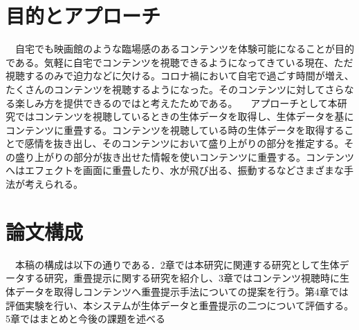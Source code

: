 \section{目的とアプローチ}
　自宅でも映画館のような臨場感のあるコンテンツを体験可能になることが目的である。気軽に自宅でコンテンツを視聴できるようになってきている現在、ただ視聴するのみで迫力などに欠ける。コロナ禍において自宅で過ごす時間が増え、たくさんのコンテンツを視聴するようになった。そのコンテンツに対してさらなる楽しみ方を提供できるのではと考えたためである。
　アプローチとして本研究ではコンテンツを視聴しているときの生体データを取得し、生体データを基にコンテンツに重畳する。コンテンツを視聴している時の生体データを取得することで感情を抜き出し、そのコンテンツにおいて盛り上がりの部分を推定する。その盛り上がりの部分が抜き出せた情報を使いコンテンツに重畳する。コンテンツへはエフェクトを画面に重畳したり、水が飛び出る、振動するなどさまざまな手法が考えられる。

\label{sec:example}


\section{論文構成}
　本稿の構成は以下の通りである．2章では本研究に関連する研究として生体データする研究，重畳提示に関する研究を紹介し、3章ではコンテンツ視聴時に生体データを取得しコンテンツへ重畳提示手法についての提案を行う。第4章では評価実験を行い、本システムが生体データと重畳提示の二つについて評価する。5章ではまとめと今後の課題を述べる


